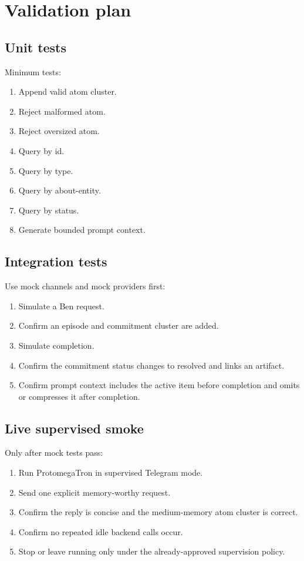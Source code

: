 \documentclass[11pt]{article}
\begin{document}
\section{Validation plan}

\subsection{Unit tests}

Minimum tests:
\begin{enumerate}
  \item Append valid atom cluster.
  \item Reject malformed atom.
  \item Reject oversized atom.
  \item Query by id.
  \item Query by type.
  \item Query by about-entity.
  \item Query by status.
  \item Generate bounded prompt context.
\end{enumerate}

\subsection{Integration tests}

Use mock channels and mock providers first:
\begin{enumerate}
  \item Simulate a Ben request.
  \item Confirm an episode and commitment cluster are added.
  \item Simulate completion.
  \item Confirm the commitment status changes to resolved and links an artifact.
  \item Confirm prompt context includes the active item before completion and omits
        or compresses it after completion.
\end{enumerate}

\subsection{Live supervised smoke}

Only after mock tests pass:
\begin{enumerate}
  \item Run ProtomegaTron in supervised Telegram mode.
  \item Send one explicit memory-worthy request.
  \item Confirm the reply is concise and the medium-memory atom cluster is correct.
  \item Confirm no repeated idle backend calls occur.
  \item Stop or leave running only under the already-approved supervision policy.
\end{enumerate}
\end{document}

